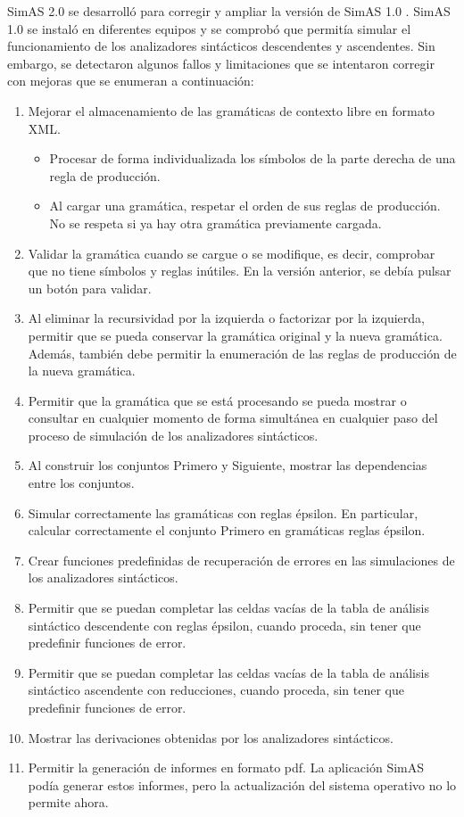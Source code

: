 SimAS 2.0 \cite{juan} se desarrolló para corregir y ampliar la versión de SimAS 1.0 \cite{vanesa}. SimAS 1.0 se instaló en diferentes equipos y se comprobó que permitía simular el funcionamiento de los analizadores sintácticos descendentes y ascendentes. Sin embargo, se detectaron algunos fallos y limitaciones que se intentaron corregir con mejoras que se enumeran a continuación:
\begin{enumerate}
     \item Mejorar el almacenamiento de las gramáticas de contexto libre en formato XML. 
         \begin{itemize}
         \item Procesar de forma individualizada los símbolos de la parte derecha de una regla de producción.
         \item Al cargar una gramática, respetar el orden de sus reglas de producción. No se respeta si ya hay otra gramática previamente cargada.
         \end{itemize}
     \item Validar la gramática cuando se cargue o se modifique, es decir, comprobar que no tiene símbolos y reglas inútiles. En la versión anterior, se debía pulsar un botón para validar.
     \item Al eliminar la recursividad por la izquierda o factorizar por la izquierda, permitir que se pueda conservar la gramática original y la nueva gramática. Además, también debe permitir la enumeración de las reglas de producción de la nueva gramática.
     \item Permitir que la gramática que se está procesando se pueda mostrar o consultar en cualquier momento de forma simultánea en cualquier paso del proceso de simulación de los analizadores sintácticos.
     \item Al construir los conjuntos Primero y Siguiente, mostrar las dependencias entre los conjuntos.
     \item Simular correctamente las gramáticas con reglas épsilon. En particular, calcular correctamente el conjunto Primero en gramáticas reglas épsilon.
     \item Crear funciones predefinidas de recuperación de errores en las simulaciones de los analizadores sintácticos. 
     \item Permitir que se puedan completar las celdas vacías de la tabla de análisis sintáctico descendente con reglas épsilon, cuando proceda, sin tener que predefinir funciones de error.
     \item Permitir que se puedan completar las celdas vacías de la tabla de análisis sintáctico ascendente con reducciones, cuando proceda, sin tener que predefinir funciones de error.
     \item Mostrar las derivaciones obtenidas por los analizadores sintácticos.
     \item Permitir la generación de informes en formato pdf. La aplicación SimAS podía generar estos informes, pero la actualización del sistema operativo no lo permite ahora.
\end{enumerate}

